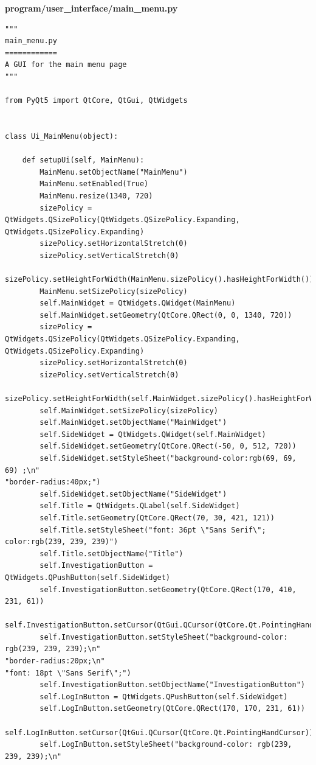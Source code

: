 \documentclass[12pt]{article}
\begin{document}
\textbf{program/user\_interface/main\_menu.py}
\begin{lstlisting}
"""
main_menu.py
============
A GUI for the main menu page
"""

from PyQt5 import QtCore, QtGui, QtWidgets


class Ui_MainMenu(object):

    def setupUi(self, MainMenu):
        MainMenu.setObjectName("MainMenu")
        MainMenu.setEnabled(True)
        MainMenu.resize(1340, 720)
        sizePolicy = QtWidgets.QSizePolicy(QtWidgets.QSizePolicy.Expanding, QtWidgets.QSizePolicy.Expanding)
        sizePolicy.setHorizontalStretch(0)
        sizePolicy.setVerticalStretch(0)
        sizePolicy.setHeightForWidth(MainMenu.sizePolicy().hasHeightForWidth())
        MainMenu.setSizePolicy(sizePolicy)
        self.MainWidget = QtWidgets.QWidget(MainMenu)
        self.MainWidget.setGeometry(QtCore.QRect(0, 0, 1340, 720))
        sizePolicy = QtWidgets.QSizePolicy(QtWidgets.QSizePolicy.Expanding, QtWidgets.QSizePolicy.Expanding)
        sizePolicy.setHorizontalStretch(0)
        sizePolicy.setVerticalStretch(0)
        sizePolicy.setHeightForWidth(self.MainWidget.sizePolicy().hasHeightForWidth())
        self.MainWidget.setSizePolicy(sizePolicy)
        self.MainWidget.setObjectName("MainWidget")
        self.SideWidget = QtWidgets.QWidget(self.MainWidget)
        self.SideWidget.setGeometry(QtCore.QRect(-50, 0, 512, 720))
        self.SideWidget.setStyleSheet("background-color:rgb(69, 69, 69) ;\n"
"border-radius:40px;")
        self.SideWidget.setObjectName("SideWidget")
        self.Title = QtWidgets.QLabel(self.SideWidget)
        self.Title.setGeometry(QtCore.QRect(70, 30, 421, 121))
        self.Title.setStyleSheet("font: 36pt \"Sans Serif\"; color:rgb(239, 239, 239)")
        self.Title.setObjectName("Title")
        self.InvestigationButton = QtWidgets.QPushButton(self.SideWidget)
        self.InvestigationButton.setGeometry(QtCore.QRect(170, 410, 231, 61))
        self.InvestigationButton.setCursor(QtGui.QCursor(QtCore.Qt.PointingHandCursor))
        self.InvestigationButton.setStyleSheet("background-color: rgb(239, 239, 239);\n"
"border-radius:20px;\n"
"font: 18pt \"Sans Serif\";")
        self.InvestigationButton.setObjectName("InvestigationButton")
        self.LogInButton = QtWidgets.QPushButton(self.SideWidget)
        self.LogInButton.setGeometry(QtCore.QRect(170, 170, 231, 61))
        self.LogInButton.setCursor(QtGui.QCursor(QtCore.Qt.PointingHandCursor))
        self.LogInButton.setStyleSheet("background-color: rgb(239, 239, 239);\n"

\end{lstlisting}
\end{document}
